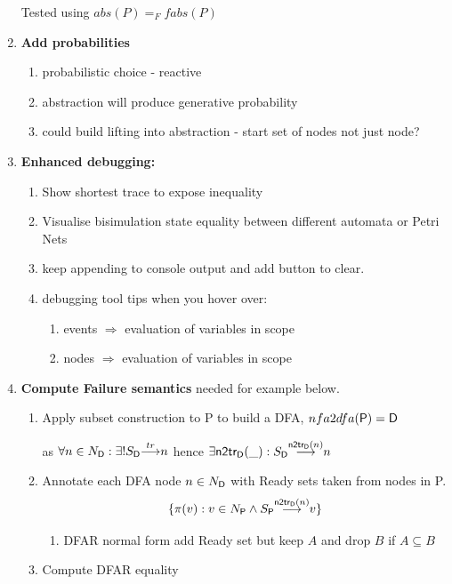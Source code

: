 \documentclass[]{article}
\begin{document}
\begin{enumerate}
Tested using $abs(P) =_F fabs(P)$

\item {\bf Add probabilities}
\begin{enumerate}
\item probabilistic choice - reactive
\item abstraction will produce generative probability
\item could build  lifting into abstraction - start set of nodes  not just node?
\end{enumerate}
\item {\bf Enhanced  debugging:}
 \begin{enumerate}
 \item Show shortest trace to expose inequality
  \item Visualise bisimulation  state equality between different automata or Petri Nets
 \item  keep appending to console output and add button to clear.
\item debugging tool tips when you hover over:
 \begin{enumerate}
 \item events $\Rightarrow$ evaluation of variables in scope
 \item  nodes $\Rightarrow$ evaluation of variables in scope
 \end{enumerate}

 \end{enumerate}

\item {\bf Compute Failure semantics} needed for example below.

\begin{enumerate}
\item Apply subset construction to {\sf P} to build a DFA,  $nfa2dfa({\sf P}) = {\sf D}$

\begin{center}as $\forall n\in N_{\sf D} : \exists ! {S_{\sf D}}{\stackrel{tr}{\longrightarrow}}{n}  $ hence $\exists {\sf n2tr_D}(\_) :   {S_{\sf D}}{\stackrel{{\sf n2tr_D}(n)}{\longrightarrow}}{n}  $
\end{center}
\item Annotate each DFA  node $n\in N_{\sf D}$ with Ready sets taken from nodes in {\sf P}.
\[\{\pi(v) : v\in N_{\sf P} \land {S_{\sf P}}{\stackrel{{\sf n2tr_D}(n)}{\longrightarrow}}{v} \}\]
\begin{enumerate}
\item DFAR normal form add Ready set but keep $A$ and drop $B$ if $A\subseteq B$
\end{enumerate}
\item Compute  DFAR equality
\end{enumerate}


\end{enumerate}
\end{document}
